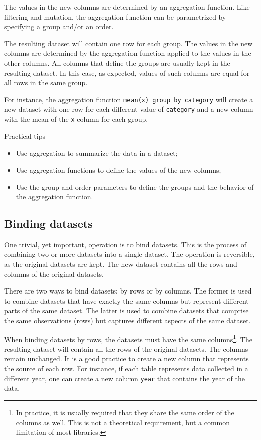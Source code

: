 The values in the new columns are determined by an aggregation function.  Like filtering
and mutation, the aggregation function can be parametrized by specifying a group and/or an
order.

The resulting dataset will contain one row for each group.  The values in the new columns
are determined by the aggregation function applied to the values in the other columns.
All columns that define the groups are usually kept in the resulting dataset.  In this
case, as expected, values of such columns are equal for all rows in the same group.

For instance, the aggregation function \texttt{mean(x) group by category} will create a
new dataset with one row for each different value of \texttt{category} and a new column
with the mean of the \texttt{x} column for each group.

\begin{mainbox}{Practical tips}
  \begin{itemize}
    \item Use aggregation to summarize the data in a dataset;
    \item Use aggregation functions to define the values of the new columns;
    \item Use the group and order parameters to define the groups and the behavior of the
      aggregation function.
  \end{itemize}
\end{mainbox}

\subsection{Binding datasets}

One trivial, yet important, operation is to bind datasets.  This is the process of
combining two or more datasets into a single dataset.  The operation is reversible, as the
original datasets are kept.  The new dataset contains all the rows and columns of the
original datasets.

There are two ways to bind datasets: by rows or by columns.  The former is used to
combine datasets that have exactly the same columns but represent different parts of the
same dataset.  The latter is used to combine datasets that comprise the same observations
(rows) but captures different aspects of the same dataset.

When binding datasets by rows, the datasets must have the same columns\footnote{In
practice, it is usually required that they share the same order of the columns as well.
This is not a theoretical requirement, but a common limitation of most libraries.}.
The resulting dataset will contain all the rows of the original datasets.  The columns
remain unchanged.  It is a good practice to create a new column that represents the source
of each row.  For instance, if each table represents data collected in a different year,
one can create a new column \texttt{year} that contains the year of the data.

